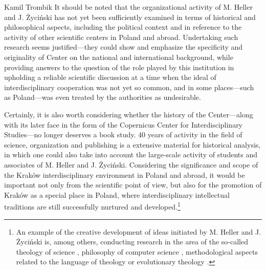 \begin{artengenv}{Kamil Trombik}
It should be noted that the organizational activity of M. Heller and J. Życiński has not yet been sufficiently examined
in terms of historical and philosophical aspects, including the political context and in reference to the activity of
other scientific centers in Poland and abroad. Undertaking such research seems justified---they could show and emphasize
the specificity and originality of Center on the national and international background, while providing answers to the
question of the role played by this institution in upholding a reliable scientific discussion at a time when the ideal
of interdisciplinary cooperation was not yet so common, and in some places---such as Poland---was even treated by the
authorities as undesirable.

Certainly, it is also worth considering whether the history of the Center---along with its later face in the form of the
Copernicus Center for Interdisciplinary Studies---no longer deserves a book study. 40 years of activity in the field of
science, organization and publishing is a extensive material for historical analysis, in which one could also take into
account the large-scale activity of students and associates of M. Heller and J. Życiński. Considering the significance
and scope of the Kraków interdisciplinary environment in Poland and abroad, it would be important not only from the
scientific point of view, but also for the promotion of Kraków as a special place in Poland, where interdisciplinary
intellectual traditions are still successfully nurtured and developed.\footnote{An example of the creative development
of ideas initiated by M. Heller and J. Życiński is, among others, conducting research in the area of the so-called
theology of science
\parencite{maczka_teologia_2015},
philosophy of computer science
\parencite{polak_computing_2016,polak_current_2017,polak_miedzy_2018,krzanowski_minimal_2017},
methodological aspects related
to the language of theology
\parencite{olszewski_negation_2018}
or evolutionary theology
\parencite{grygiel_what_2018}.
}


\end{artengenv}\label{trombik-stop}
